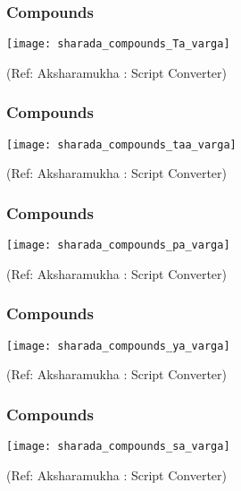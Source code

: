 \begin{frame}[fragile]\frametitle{Compounds}

	\begin{center}
	\texttt{[image: sharada\_compounds\_Ta\_varga]} 
	
	{\tiny (Ref: Aksharamukha : Script Converter)}
	\end{center}	

\end{frame}

\begin{frame}[fragile]\frametitle{Compounds}

	\begin{center}
	\texttt{[image: sharada\_compounds\_taa\_varga]} 
	
	{\tiny (Ref: Aksharamukha : Script Converter)}
	\end{center}	

\end{frame}

\begin{frame}[fragile]\frametitle{Compounds}

	\begin{center}
	\texttt{[image: sharada\_compounds\_pa\_varga]} 
	
	{\tiny (Ref: Aksharamukha : Script Converter)}
	\end{center}	

\end{frame}

\begin{frame}[fragile]\frametitle{Compounds}

	\begin{center}
	\texttt{[image: sharada\_compounds\_ya\_varga]} 
	
	{\tiny (Ref: Aksharamukha : Script Converter)}
	\end{center}	

\end{frame}

\begin{frame}[fragile]\frametitle{Compounds}

	\begin{center}
	\texttt{[image: sharada\_compounds\_sa\_varga]} 
	
	{\tiny (Ref: Aksharamukha : Script Converter)}
	\end{center}	

\end{frame}

